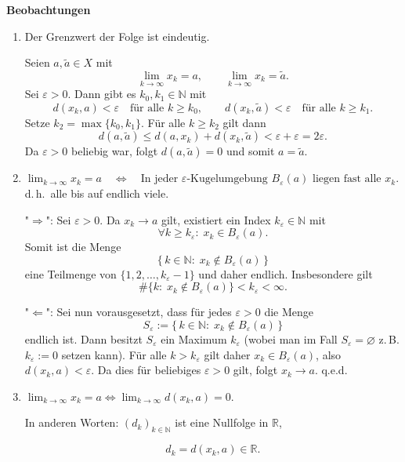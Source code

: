 \begin{bemerkungbox}
    \textbf{Beobachtungen}
    \begin{enumerate}
        \item Der Grenzwert der Folge ist eindeutig.

            Seien $a,\widetilde{a}\in X$ mit
            $$
            \lim_{k\to\infty} x_k = a,\qquad \lim_{k\to\infty} x_k = \widetilde{a}.
            $$
            Sei $\varepsilon>0$. Dann gibt es $k_0,k_1\in\mathbb{N}$ mit
            $$
            d(x_k,a)<\varepsilon\quad\text{für alle }k\ge k_0,
            \qquad
            d(x_k,\widetilde{a})<\varepsilon\quad\text{für alle }k\ge k_1.
            $$
            Setze $k_2=\max\{k_0,k_1\}$. Für alle $k\ge k_2$ gilt dann
            $$
            d(a,\widetilde{a}) \le d(a,x_k)+d(x_k,\widetilde{a}) < \varepsilon+\varepsilon = 2\varepsilon.
            $$
            Da $\varepsilon>0$ beliebig war, folgt $d(a,\widetilde{a})=0$ und somit $a=\widetilde{a}$.

        \item 
            $
            \lim_{k\to\infty} x_k = a \quad\Longleftrightarrow\quad \text{In jeder }\varepsilon\text{-Kugelumgebung }B_\varepsilon(a)\text{ liegen fast alle }x_k.
            $
            \noindent
            d.\,h.\ alle bis auf endlich viele.

            \begin{beweisbox}
            "$\Rightarrow$": Sei $\varepsilon>0$. Da $x_k\to a$ gilt, existiert ein Index $k_\varepsilon\in\mathbb{N}$ mit
            $$
            \forall k\ge k_\varepsilon:\; x_k\in B_\varepsilon(a).
            $$
            Somit ist die Menge
            $$
            \{\,k\in\mathbb{N}:\; x_k\notin B_\varepsilon(a)\,\}
            $$
            eine Teilmenge von $\{1,2,\dots,k_\varepsilon-1\}$ und daher endlich. Insbesondere gilt
            $$
            \#\{k:\; x_k\notin B_\varepsilon(a)\} < k_\varepsilon <\infty.
            $$

            "$\Leftarrow$": Sei nun vorausgesetzt, dass für jedes $\varepsilon>0$ die Menge
            $$
            S_\varepsilon:=\{\,k\in\mathbb{N}:\; x_k\notin B_\varepsilon(a)\,\}
            $$
            endlich ist. Dann besitzt $S_\varepsilon$ ein Maximum $k_\varepsilon$ (wobei man im Fall $S_\varepsilon=\varnothing$ z.\,B. $k_\varepsilon:=0$ setzen kann). Für alle $k>k_\varepsilon$ gilt daher $x_k\in B_\varepsilon(a)$, also $d(x_k,a)<\varepsilon$. Da dies für beliebiges $\varepsilon>0$ gilt, folgt $x_k\to a$.
            q.e.d.
            \end{beweisbox}

        \item
            $
            \lim_{k\to\infty} x_k = a \iff \lim_{k\to\infty} d(x_k,a) = 0.
            $

            In anderen Worten: $(d_k)_{k\in\mathbb{N}}$ ist eine Nullfolge in $\mathbb{R}$,

            $$
            d_k = d(x_k,a) \in \mathbb{R}.
            $$  
    \end{enumerate}
\end{bemerkungbox}

